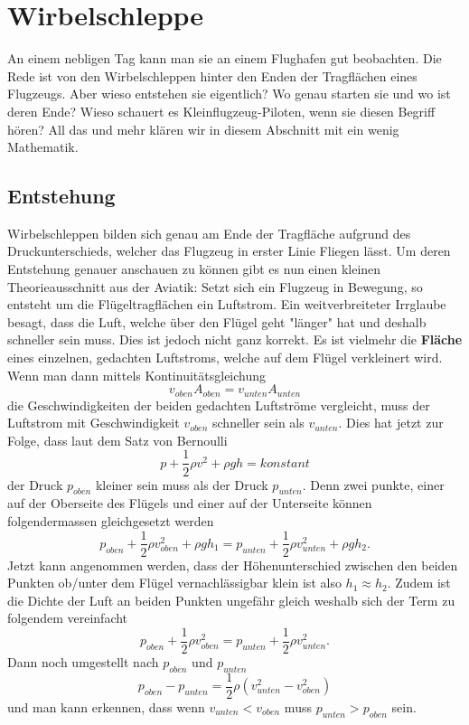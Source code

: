 \section{Wirbelschleppe}
An einem nebligen Tag kann man sie an einem Flughafen gut beobachten. 
Die Rede ist von den Wirbelschleppen hinter den Enden der Tragflächen eines Flugzeugs.
Aber wieso entstehen sie eigentlich? 
Wo genau starten sie und wo ist deren Ende?
Wieso schauert es Kleinflugzeug-Piloten, wenn sie diesen Begriff hören?
All das und mehr klären wir in diesem Abschnitt mit ein wenig Mathematik.

\subsection{Entstehung}
Wirbelschleppen bilden sich genau am Ende der Tragfläche aufgrund des Druckunterschieds, welcher das Flugzeug in erster Linie Fliegen lässt.
Um deren Entstehung genauer anschauen zu können gibt es nun einen kleinen Theorieausschnitt aus der Aviatik:
Setzt sich ein Flugzeug in Bewegung, so entsteht um die Flügeltragflächen ein Luftstrom.
Ein weitverbreiteter Irrglaube besagt, dass die Luft, welche über den Flügel geht "länger" hat und deshalb schneller sein muss.
Dies ist jedoch nicht ganz korrekt.
Es ist vielmehr die \textbf{Fläche} eines einzelnen, gedachten Luftstroms, welche auf dem Flügel verkleinert wird.%
Wenn man dann mittels Kontinuitätsgleichung
\[v_{oben}A_{oben} = v_{unten}A_{unten}\]
die Geschwindigkeiten der beiden gedachten Luftströme vergleicht, muss der Luftstrom mit Geschwindigkeit $v_{oben}$ schneller sein als $v_{unten}$.
Dies hat jetzt zur Folge, dass laut dem Satz von Bernoulli 
\[p+\frac{1}{2}\rho v^2+\rho gh=konstant\]
der Druck $p_{oben}$ kleiner sein muss als der Druck $p_{unten}$.
Denn zwei punkte, einer auf der Oberseite des Flügels und einer auf der Unterseite können folgendermassen gleichgesetzt werden
\[p_{oben}+\frac{1}{2}\rho v^2_{oben} + \rho gh_1 = p_{unten}+\frac{1}{2}\rho v^2_{unten}+\rho gh_2.\]
Jetzt kann angenommen werden, dass der Höhenunterschied zwischen den beiden Punkten ob/unter dem Flügel vernachlässigbar klein ist also \(h_1\approx h_2\).
Zudem ist die Dichte der Luft an beiden Punkten ungefähr gleich weshalb sich der Term zu folgendem vereinfacht
\[p_{oben}+\frac{1}{2}\rho v^2_{oben} = p_{unten}+\frac{1}{2}\rho v^2_{unten}.\]
Dann noch umgestellt nach $p_{oben}$ und $p_{unten}$
\[p_{oben}-p_{unten} = \frac{1}{2}\rho( v^2_{unten}-v^2_{oben})\]
und man kann erkennen, dass wenn $v_{unten} < v_{oben}$ muss $p_{unten} > p_{oben}$ sein.